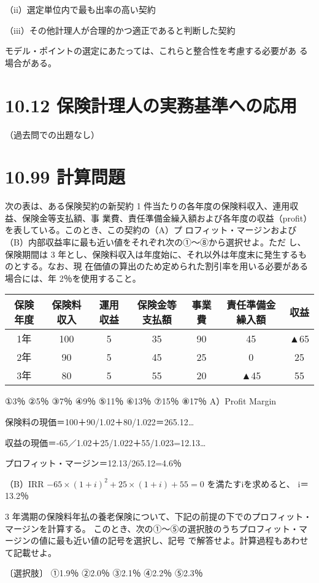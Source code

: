 \documentclass[report,gutter=10mm,fore-edge=10mm,uplatex,dvipdfmx]{jlreq}
\begin{document}
（ii）選定単位内で最も出率の高い契約

（iii）その他計理人が合理的かつ適正であると判断した契約

モデル・ポイントの選定にあたっては、これらと整合性を考慮する必要があ
る場合がある。


\section{10.12 保険計理人の実務基準への応用}
（過去問での出題なし）

\section{10.99 計算問題}
次の表は、ある保険契約の新契約 1 件当たりの各年度の保険料収入、連用収益、保険金等支払額、事
業費、責任準備金繰入額および各年度の収益（profit）を表している。このとき、この契約の（A）プ
ロフィット・マージンおよび（B）内部収益率に最も近い値をそれぞれ次の①～⑧から選択せよ。ただ
し、保険期間は 3 年とし、保険料収入は年度始に、それ以外は年度末に発生するものとする。なお、現
在価値の算出のため定められた割引率を用いる必要がある場合には、年 2％を使用すること。

\begin{tabular}{|c|c|c|c|c|c|c|}
\hline
 保険年度&保険料収入& 運用収益&保険金等支払額&事業費&責任準備金繰入額&収益\\ \hline
 1年& 100&5 &35 &90 &45&▲65 \\ \hline
 2年& 90&5 &45 &25& 0&25 \\ \hline
 3年& 80&5 &55 &20&▲45&55 \\ \hline
\end{tabular}

①3％ ②5％ ③7％ ④9％ ⑤11％ ⑥13％ ⑦15％ ⑧17％
\answer{}
A）Profit Margin

保険料の現価＝100＋90/1.02＋80/1.022＝265.12…

収益の現価＝-65／1.02＋25/1.022＋55/1.023=12.13…

プロフィット・マージン＝12.13/265.12=4.6％

（B）IRR
$-65\times(1+i)^2+25\times(1+i)+55=0$ を満たすiを求めると、
i＝13.2％

3 年満期の保険料年払の養老保険について、下記の前提の下でのプロフィット・マージンを計算する。
このとき、次の①～⑤の選択肢のうちプロフィット・マージンの値に最も近い値の記号を選択し、記号
で解答せよ。計算過程もあわせて記載せよ。

〔選択肢〕
①1.9％ ②2.0％ ③2.1％
④2.2％ ⑤2.3％
\end{document}
